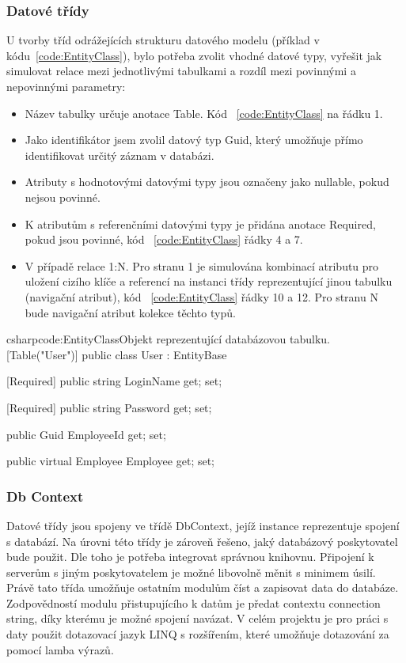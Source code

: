 \documentclass[
  glossaries,
]{kidiplom}
\begin{document}
\subsubsection{Datové třídy}
 U tvorby tříd odrážejících strukturu datového modelu (příklad v kódu~\ref{code:EntityClass}), bylo potřeba zvolit vhodné datové typy, vyřešit jak simulovat relace mezi jednotlivými tabulkami a rozdíl mezi povinnými a nepovinnými parametry:
\begin{itemize}
	\item Název tabulky určuje anotace Table. Kód ~\ref{code:EntityClass} na řádku 1. 
	\item Jako identifikátor jsem zvolil datový typ Guid, který umožňuje přímo identifikovat určitý záznam v databázi.
	\item Atributy s hodnotovými datovými typy jsou označeny jako nullable, pokud nejsou povinné.
	\item K atributům s referenčními datovými typy je přidána anotace Required, pokud jsou povinné, kód ~\ref{code:EntityClass} řádky 4 a 7.
	\item V případě relace 1:N. Pro stranu 1 je simulována kombinací atributu pro uložení cizího klíče a referencí na instanci třídy reprezentující jinou tabulku (navigační atribut), kód ~\ref{code:EntityClass} řádky 10 a 12. Pro stranu N bude navigační atribut kolekce těchto typů.
\end{itemize}

\begin{kicode}{csharp}{code:EntityClass}{Objekt reprezentující databázovou tabulku.}
[Table("User")]
    public class User : EntityBase
    {
        [Required]
        public string LoginName { get; set; }

        [Required]
        public string Password { get; set; }

        public Guid EmployeeId { get; set; }

        public virtual Employee Employee { get; set; }
    }
\end{kicode}

\subsubsection{Db Context}
Datové třídy jsou spojeny ve třídě DbContext, jejíž instance reprezentuje spojení s databází. Na úrovni této třídy je zároveň řešeno, jaký databázový poskytovatel bude použit. Dle toho je potřeba integrovat správnou knihovnu. Připojení k serverům s jiným poskytovatelem je možné libovolně měnit s minimem úsilí. Právě tato třída umožňuje ostatním modulům číst a zapisovat data do databáze. Zodpovědností modulu přistupujícího k datům je předat contextu connection string, díky kterému je možné spojení navázat. V celém projektu je pro práci s daty použit dotazovací jazyk LINQ s rozšířením, které umožňuje dotazování za pomocí lamba výrazů.
\end{document}
